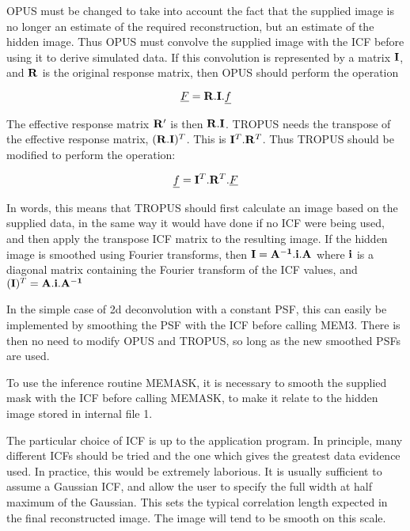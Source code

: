 OPUS must be changed to take into account the fact that the supplied image is
no  longer an estimate of the required reconstruction, but an estimate of the
hidden  image. Thus OPUS must convolve the supplied image with the ICF before
using it  to derive simulated data. If this convolution is represented by a
matrix  ${\bf I}$, and ${\bf R}$ is the original response matrix, then OPUS
should  perform the operation

\begin {equation}
\underline{F}={\bf R}.{\bf I}.\underline{f}
\end {equation}

The effective response matrix ${\bf R}'$ is then ${\bf R}.{\bf I}$. TROPUS
needs  the transpose of the effective response matrix, $({\bf R}.{\bf I})^{T}$.
This is ${\bf I}^{T}.{\bf R}^{T}$. Thus TROPUS should be modified to perform
the  operation:

\begin {equation}
\underline{f}={\bf I}^{T}.{\bf R}^{T}.\underline{F}
\end {equation}

In words, this means that TROPUS should first calculate an image based on the
supplied data, in the same way it would have done if no ICF were being used, and
then apply the transpose ICF matrix to the resulting image. If the hidden image
is smoothed using Fourier transforms, then ${\bf I}={\bf A^{-1}}.{\bf i}.{\bf
A}$ where ${\bf i}$ is a diagonal matrix containing the Fourier transform of the
ICF values, and $({\bf I})^{T}={\bf A}.{\bf i}.{\bf A^{-1}}$ 

In the simple case of 2d deconvolution with a constant PSF, this can easily be 
implemented by smoothing the PSF with the ICF before calling MEM3. There is
then  no need to modify OPUS and TROPUS, so long as the new smoothed PSFs are
used.

To use the inference routine MEMASK, it is necessary to smooth the supplied
mask  with the ICF before calling MEMASK, to make it relate to the hidden image 
stored in internal file 1.

The particular choice of ICF is up to the application program. In principle,
many different ICFs should be tried and the one which gives the greatest data
evidence used. In practice, this would be extremely laborious. It is usually
sufficient to assume a Gaussian ICF, and allow the user to specify the full
width at half maximum of the Gaussian. This sets the typical correlation length
expected in the final reconstructed image. The image will tend to be smooth on
this scale.

